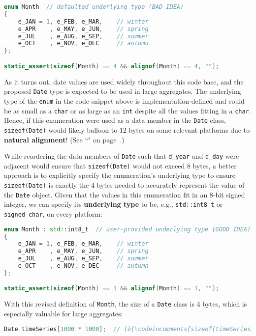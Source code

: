 \begin{lstlisting}[language=C++]
enum Month  // defaulted underlying type (BAD IDEA)
{
    e_JAN = 1, e_FEB, e_MAR,    // winter
    e_APR    , e_MAY, e_JUN,    // spring
    e_JUL    , e_AUG, e_SEP,    // summer
    e_OCT    , e_NOV, e_DEC     // autumn
};

static_assert(sizeof(Month) == 4 && alignof(Month) == 4, "");
\end{lstlisting}
    
\noindent As it turns out, date values are used widely throughout this code base,
and the proposed \texttt{Date} type is expected to be used in large
aggregates. The underlying type of the \texttt{enum} in the code snippet
above is implementation-defined and could be as small as a \texttt{char}
or as large as an \texttt{int} despite all the values fitting in a
\texttt{char}. Hence, if this enumeration were used as a data member in
the \texttt{Date} class, \texttt{sizeof(Date)} would likely balloon to
12 bytes on some relevant platforms due to \textbf{natural alignment}!
(See ``" on page~\pageref{alignas}.)

While reordering the data members of \texttt{Date} such that \texttt{d\_year} and
\texttt{d\_day} were adjacent would ensure that \texttt{sizeof(Date)}
would not exceed 8 bytes, a better approach is to explicitly specify the
enumeration's underlying type to ensure \texttt{sizeof(Date)} is exactly
the 4 bytes needed to accurately represent the value of the
\texttt{Date} object. Given that the values in this enumeration fit in
an 8-bit signed integer, we can specify its \textbf{underlying type} to
be, e.g., \texttt{std::int8\_t} or \texttt{signed}~\texttt{char}, on
every platform:

\begin{lstlisting}[language=C++]
enum Month : std::int8_t  // user-provided underlying type (GOOD IDEA)
{
    e_JAN = 1, e_FEB, e_MAR,    // winter
    e_APR    , e_MAY, e_JUN,    // spring
    e_JUL    , e_AUG, e_SEP,    // summer
    e_OCT    , e_NOV, e_DEC     // autumn
};

static_assert(sizeof(Month) == 1 && alignof(Month) == 1, "");
\end{lstlisting}
    
\noindent With this revised definition of \texttt{Month}, the size of a
\texttt{Date} class is 4 bytes, which is especially valuable for large
aggregates:

\begin{lstlisting}[language=C++]
Date timeSeries[1000 * 1000];  // (ù{\codeincomments{sizeof(timeSeries)}}ù) is now 4Mb (not 12Mb)
\end{lstlisting}
    

